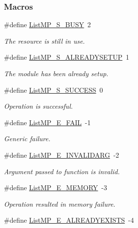 \subsubsection*{Macros}
\begin{DoxyCompactItemize}
\item 
\#define \hyperlink{_list_m_p_8h_aae3ea24c5161e44b42c0a2c6f73fd3d2}{List\-M\-P\-\_\-\-S\-\_\-\-B\-U\-S\-Y}~2
\begin{DoxyCompactList}\small\item\em The resource is still in use. \end{DoxyCompactList}\item 
\#define \hyperlink{_list_m_p_8h_ae2dbc4743a0ddc0c4aaded37551cf25e}{List\-M\-P\-\_\-\-S\-\_\-\-A\-L\-R\-E\-A\-D\-Y\-S\-E\-T\-U\-P}~1
\begin{DoxyCompactList}\small\item\em The module has been already setup. \end{DoxyCompactList}\item 
\#define \hyperlink{_list_m_p_8h_a67e97f10cd480f457375e9a20bb41e27}{List\-M\-P\-\_\-\-S\-\_\-\-S\-U\-C\-C\-E\-S\-S}~0
\begin{DoxyCompactList}\small\item\em Operation is successful. \end{DoxyCompactList}\item 
\#define \hyperlink{_list_m_p_8h_a4aa4e08eddd7d36b42395070f21125df}{List\-M\-P\-\_\-\-E\-\_\-\-F\-A\-I\-L}~-\/1
\begin{DoxyCompactList}\small\item\em Generic failure. \end{DoxyCompactList}\item 
\#define \hyperlink{_list_m_p_8h_a0cfe16cd038629372772230866ef681f}{List\-M\-P\-\_\-\-E\-\_\-\-I\-N\-V\-A\-L\-I\-D\-A\-R\-G}~-\/2
\begin{DoxyCompactList}\small\item\em Argument passed to function is invalid. \end{DoxyCompactList}\item 
\#define \hyperlink{_list_m_p_8h_ae855742ffb668b39109633d3a3fe552c}{List\-M\-P\-\_\-\-E\-\_\-\-M\-E\-M\-O\-R\-Y}~-\/3
\begin{DoxyCompactList}\small\item\em Operation resulted in memory failure. \end{DoxyCompactList}\item 
\#define \hyperlink{_list_m_p_8h_aa943a6dd86b5cd4092faa9a2c3650678}{List\-M\-P\-\_\-\-E\-\_\-\-A\-L\-R\-E\-A\-D\-Y\-E\-X\-I\-S\-T\-S}~-\/4

\end{DoxyCompactItemize}
